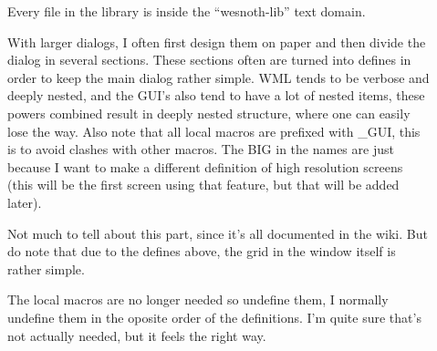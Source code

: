 \begin{description}
	\begin{description}
	\item[]
		Every file in the library is inside the ``wesnoth-lib'' text domain.

	\item[]
		With larger dialogs, I often first design them on paper and then divide the
dialog in several sections. These sections often are turned into defines in
order to keep the main dialog rather simple. WML tends to be verbose and deeply
nested, and the GUI's also tend to have a lot of nested items, these powers
combined result in deeply nested structure, where one can easily lose the way.
Also note that all local macros are prefixed with \_GUI, this is to avoid clashes
with other macros. The BIG in the names are just because I want to make a
different definition of high resolution screens (this will be the first screen
using that feature, but that will be added later).

	\item[]
		Not much to tell about this part, since it's all documented in the wiki. %
But do note that due to the defines above, the grid in the window itself is
rather simple.

	\item[]
		The local macros are no longer needed so undefine them, I normally
undefine them in the oposite order of the definitions. I'm quite sure that's not
actually needed, but it feels the right way\texttrademark.

	\end{description}

\end{description}

